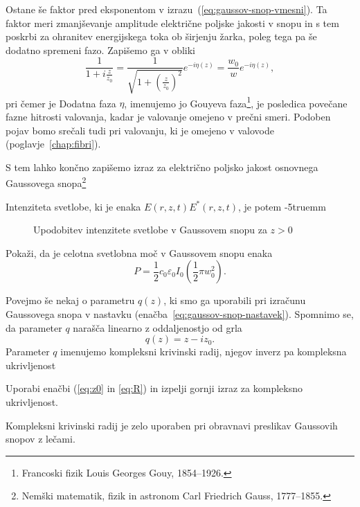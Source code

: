 Ostane še faktor pred eksponentom v izrazu~(\ref{eq:gaussov-snop-vmesni}). Ta faktor meri
zmanjševanje amplitude električne poljske jakosti v snopu in s tem poskrbi za ohranitev energijskega
toka ob širjenju žarka, poleg tega pa še dodatno spremeni fazo. Zapišemo ga v obliki
\begin{equation}
\frac{1}{1+i\frac{z}{z_{0}}}=\frac{1}{\sqrt{1+(\frac{z}{z_0})^{2}}}e^{-i\eta(z)}=\frac{w_{0}}{w}e^{-i\eta(z)},
\end{equation}
 pri čemer je
Dodatna faza $\eta$, imenujemo jo Gouyeva 
faza\footnote{Francoski fizik Louis Georges Gouy, 1854--1926.},
je posledica povečane fazne hitrosti valovanja,
kadar je valovanje omejeno v prečni smeri. Podoben pojav bomo srečali tudi pri valovanju, ki je 
omejeno v valovode (poglavje~\ref{chap:fibri}).

S tem lahko končno zapišemo izraz za električno poljsko jakost osnovnega Gaussovega 
snopa\footnote{Nemški matematik, fizik in astronom Carl Friedrich Gauss, 1777--1855.}

Intenziteta svetlobe, ki je enaka $E(r,z,t)E^*(r,z,t)$, je potem 
\vglue-5truemm
\begin{figure}[h]
\centering
\def\svgwidth{100truemm} 

\caption{Upodobitev intenzitete svetlobe v Gaussovem snopu za $z>0$ }
\label{fig:Gauss_3D}
\end{figure}

\begin{definition}
\label{naloga-širina-snopa}
Pokaži, da je celotna svetlobna moč v Gaussovem snopu 
enaka 
\begin{equation}
P = \frac{1}{2} c_0 \varepsilon_0 I_0 \left(\frac{1}{2}\pi w_0^2\right).
\end{equation}
\end{definition}

Povejmo še nekaj o parametru $q(z)$, ki smo ga uporabili pri izračunu Gaussovega snopa v nastavku
(enačba~\ref{eq:gaussov-snop-nastavek}). Spomnimo 
se, da parameter $q$ narašča linearno z oddaljenostjo od grla
\begin{equation}
q(z) = z -iz_0.
\label{eq:q}
\end{equation}
Parameter $q$ imenujemo kompleksni krivinski radij, 
njegov inverz pa kompleksna ukrivljenost
\begin{definition}
Uporabi enačbi (\ref{eq:z0} in \ref{eq:R}) in izpelji gornji izraz za kompleksno ukrivljenost.
\end{definition}
Kompleksni krivinski radij je zelo uporaben pri obravnavi preslikav Gaussovih snopov z lečami.

